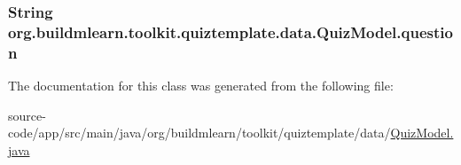 \subsubsection[{\texorpdfstring{question}{question}}]{\setlength{\rightskip}{0pt plus 5cm}String org.\+buildmlearn.\+toolkit.\+quiztemplate.\+data.\+Quiz\+Model.\+question\hspace{0.3cm}{\ttfamily [private]}}\hypertarget{classorg_1_1buildmlearn_1_1toolkit_1_1quiztemplate_1_1data_1_1QuizModel_a4e88fb6898a62a5b7b7260f505a07b4b}{}\label{classorg_1_1buildmlearn_1_1toolkit_1_1quiztemplate_1_1data_1_1QuizModel_a4e88fb6898a62a5b7b7260f505a07b4b}


The documentation for this class was generated from the following file\+:\begin{DoxyCompactItemize}
\item 
source-\/code/app/src/main/java/org/buildmlearn/toolkit/quiztemplate/data/\hyperlink{quiztemplate_2data_2QuizModel_8java}{Quiz\+Model.\+java}\end{DoxyCompactItemize}

